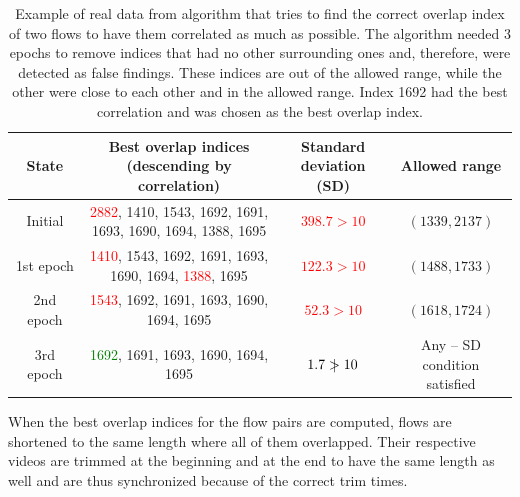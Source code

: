 \begin{table}[!ht]
    \begin{center}
        \begin{tabular}{ |c|c|c|c| }
            \hline
            State & \makecell{Best overlap indices \\ (descending by correlation)} & \makecell{Standard \\ deviation (SD)} & Allowed range \\
            \hline
            \hline
                Initial & \makecell{\textcolor{red}{2882}, 1410, 1543, 1692, 1691,\\1693, 1690, 1694, 1388, 1695} & \textcolor{red}{$398.7 > 10$} & $(1339, 2137)$ \\
            \hline
                1st epoch & \makecell{\textcolor{red}{1410}, 1543, 1692, 1691, 1693,\\1690, 1694, \textcolor{red}{1388}, 1695} & \textcolor{red}{$122.3 > 10$} & $(1488, 1733)$ \\
            \hline
                2nd epoch & \makecell{\textcolor{red}{1543}, 1692, 1691, 1693, 1690,\\1694, 1695} & \textcolor{red}{$52.3 > 10$} & $(1618, 1724)$ \\
            \hline
                3rd epoch & \makecell{\textcolor{green}{1692}, 1691, 1693, 1690, 1694,\\1695} & \textcolor{green}{$1.7 \mathrel{\ooalign{$>$\cr\hidewidth$|$\hidewidth}} 10$} & \makecell{Any -- SD \\ condition satisfied} \\
            \hline
        \end{tabular}
    \end{center}
    \caption{Example of real data from algorithm that tries to find the correct overlap index of two flows to have them correlated as much as possible. The algorithm needed 3 epochs to remove indices that had no other surrounding ones and, therefore, were detected as false findings. These indices are out of the allowed range, while the other were close to each other and in the allowed range. Index 1692 had the best correlation and was chosen as the best overlap index.}
    \label{tab:correlation-pick}
\end{table}

When the best overlap indices for the flow pairs are computed, flows are shortened to the same length where all of them overlapped. Their respective videos are trimmed at the beginning and at the end to have the same length as well and are thus synchronized because of the correct trim times.

